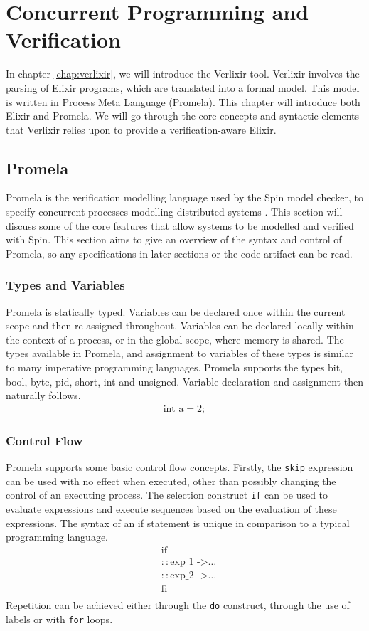 \chapter{Concurrent Programming and Verification}
In chapter \ref{chap:verlixir}, we will introduce the Verlixir tool. Verlixir involves the parsing of Elixir programs, which are translated into a formal model. This model is written in Process Meta Language (Promela). This chapter will introduce both Elixir and Promela. We will go through the core concepts and syntactic elements that Verlixir relies upon to provide a verification-aware Elixir. 
\section{Promela} \label{sec:promela}
Promela is the verification modelling language used by the Spin model checker, to specify concurrent processes modelling distributed systems \cite{spin}. This section will discuss some of the core features that allow systems to be modelled and verified with Spin. This section aims to give an overview of the syntax and control of Promela, so any specifications in later sections or the code artifact can be read.
\subsection{Types and Variables}
Promela is statically typed. Variables can be declared once within the current scope and then re-assigned throughout. Variables can be declared locally within the context of a process, or in the global scope, where memory is shared. The types available in Promela, and assignment to variables of these types is similar to many imperative programming languages. Promela supports the types bit, bool, byte, pid, short, int and unsigned. Variable declaration and assignment then naturally follows.
\[
\begin{aligned}
\text{int a} = 2;
\end{aligned}
\]
\subsection{Control Flow}
Promela supports some basic control flow concepts. Firstly, the \texttt{skip} expression can be used with no effect when executed, other than possibly changing the control of an executing process. The selection construct \texttt{if} can be used to evaluate expressions and execute sequences based on the evaluation of these expressions. The syntax of an if statement is unique in comparison to a typical programming language.
\[
\begin{aligned}
& \text{if} \\
& :: \text{exp\_1 ->} \dots \\
& :: \text{exp\_2 ->} \dots \\
& \text{fi} \\
\end{aligned}    
\]
Repetition can be achieved either through the \texttt{do} construct, through the use of labels or with \texttt{for} loops.
